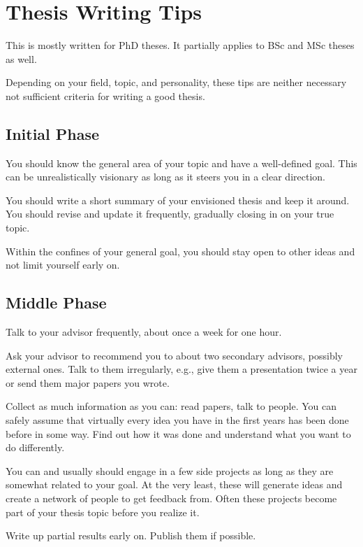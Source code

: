 \documentclass[12pt]{article}
\begin{document}
\section{Thesis Writing Tips}

This is mostly written for PhD theses.
It partially applies to BSc and MSc theses as well.

Depending on your field, topic, and personality, these tips are neither necessary not sufficient criteria for writing a good thesis.

\subsection{Initial Phase}

You should know the general area of your topic and have a well-defined goal.
This can be unrealistically visionary as long as it steers you in a clear direction.
\medskip

You should write a short summary of your envisioned thesis and keep it around.
You should revise and update it frequently, gradually closing in on your true topic.
\medskip

Within the confines of your general goal, you should stay open to other ideas and not limit yourself early on.

\subsection{Middle Phase}

Talk to your advisor frequently, about once a week for one hour.
\medskip

Ask your advisor to recommend you to about two secondary advisors, possibly external ones.
Talk to them irregularly, e.g., give them a presentation twice a year or send them major papers you wrote.
\medskip

Collect as much information as you can: read papers, talk to people.
You can safely assume that virtually every idea you have in the first years has been done before in some way.
Find out how it was done and understand what you want to do differently.
\medskip

You can and usually should engage in a few side projects as long as they are somewhat related to your goal.
At the very least, these will generate ideas and create a network of people to get feedback from.
Often these projects become part of your thesis topic before you realize it.
\medskip

Write up partial results early on.
Publish them if possible.
\end{document}
